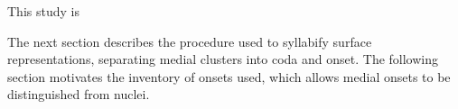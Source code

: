 
This study is 

The next section describes the procedure used to syllabify surface representations, separating medial clusters into coda and onset. The following section motivates the inventory of onsets used, which allows medial onsets to be distinguished from nuclei.
